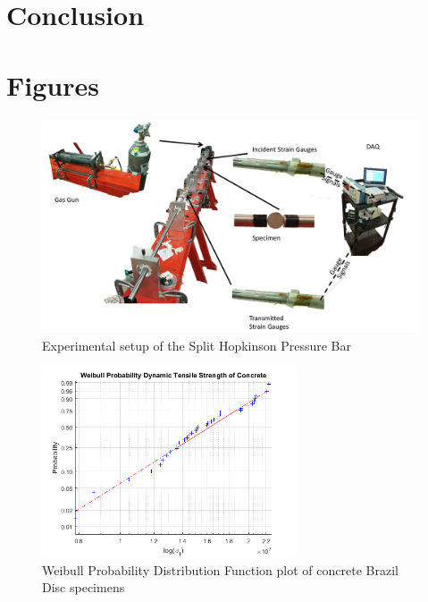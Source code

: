 \documentclass[12pt]{article}
\begin{document}
\section{Conclusion} %


\section{Figures}
\begin{figure}[H]
	\centering
	\includegraphics[width=1\textwidth]{TestSetUp.png}
	\caption{Experimental setup of the Split Hopkinson Pressure Bar}
	\label{fig:TestSetup}
\end{figure}

\begin{figure}[H]
	\centering
	\includegraphics[width=0.67\textwidth]{Weibull.png}
	\caption{Weibull Probability Distribution Function plot of concrete Brazil Disc specimens}
	\label{fig:Weibull}
\end{figure}
\end{document}
